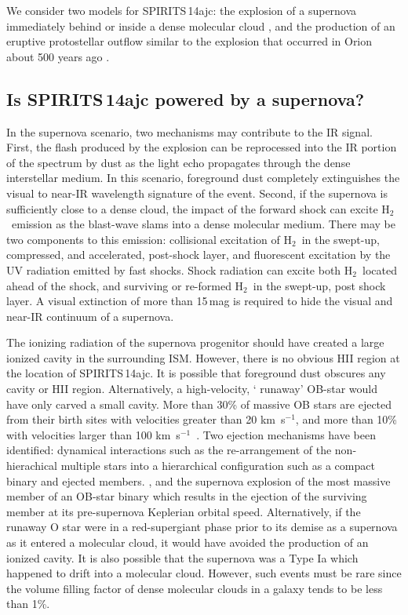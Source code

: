 \documentclass[twocolumn,times]{aastex6}
\newcommand{\kms}{km~s{$^{-1}$}}
\newcommand{\hh}{H{$_2$}}
\begin{document}
We consider two models for SPIRITS\,14ajc:   the explosion of a supernova
immediately behind or inside a dense molecular cloud \citep{Kasliwal2005}, 
and the production of an eruptive protostellar outflow similar  to
the explosion that occurred in Orion about 500 years ago 
\citep{Zapata2009,Bally2011,BallyGinsburg2015}. 

\subsection{Is SPIRITS\,14ajc powered by a supernova?}

In the supernova scenario,  two mechanisms may contribute to the IR signal.
First, the flash produced by the explosion can be reprocessed into
the IR portion of the spectrum by dust as the light echo propagates 
through the dense interstellar medium.  In this scenario, foreground dust  completely
extinguishes the visual to near-IR wavelength signature of the event.   
Second, if the supernova is sufficiently close to a dense cloud, the impact of the forward shock can
excite  \hh\ emission as the  blast-wave slams into a dense molecular medium.   
There may be two components to this emission: collisional excitation of \hh\  in the 
swept-up, compressed, and accelerated, post-shock layer, and fluorescent excitation
by  the UV radiation emitted by fast shocks.    Shock radiation can excite both  
\hh\ located ahead of the shock,  and surviving or re-formed \hh\ in the swept-up,
post shock layer.   A  visual  extinction of  more than 15\,mag is required to hide the visual
and near-IR continuum of a supernova.    

The ionizing radiation of the supernova progenitor  
should have created a large ionized cavity in the surrounding ISM.  
However,  there is no obvious HII region at the location of SPIRITS\,14ajc.    
It is possible that foreground dust obscures any cavity or HII region.   
Alternatively,  a high-velocity,  ` runaway'  OB-star would have only carved a small cavity.   
More than 30\% of massive  OB stars are ejected  from their birth sites with velocities 
greater than 20 \kms, and more than 10\% with  velocities larger  than 100 \kms\  
\citep{GiesBolton1986}.   Two ejection mechanisms have been identified:  
dynamical  interactions such as the re-arrangement of the 
non-hierachical multiple stars into a hierarchical configuration such as a compact binary 
and ejected members.  \citep{Hoogerwerf2000,Hoogerwerf2001,Gualandris2004}, and 
the  supernova explosion of the most massive member of an OB-star binary which
results in the ejection of the surviving member at its pre-supernova Keplerian orbital speed. 
Alternatively, if the runaway O star were in a red-supergiant phase prior to its demise as a supernova
as it entered a molecular cloud, it would have avoided the production of an ionized cavity. 
It is also possible that the supernova was a Type Ia which happened to drift into
a molecular cloud.  However, such events must be rare since the volume filling factor
of dense molecular clouds in a galaxy tends to be less than 1\%.
\end{document}
